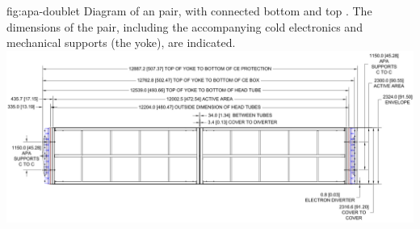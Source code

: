 \begin{dunefigure}{fig:apa-doublet}
{Diagram of an  pair, with connected bottom and top . The dimensions of the  pair, including the accompanying cold electronics and mechanical supports (the yoke), are indicated.}
\includegraphics[width=1\textwidth]{graphics/sp-apa-stack.jpg} 
\end{dunefigure}

